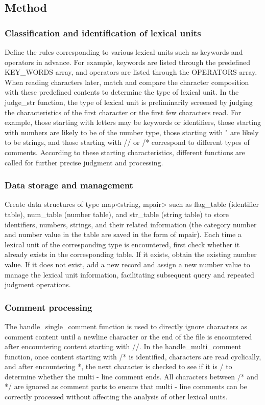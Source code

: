 \documentclass[a4paper,12pt]{article}
\begin{document}
\subsection{Method}
\subsubsection{Classification and identification of lexical units}
Define the rules corresponding to various lexical units such as keywords and operators in advance. For example, keywords are listed through the predefined KEY\_WORDS array, and operators are listed through the OPERATORS array. When reading characters later, match and compare the character composition with these predefined contents to determine the type of lexical unit. In the judge\_str function, the type of lexical unit is preliminarily screened by judging the characteristics of the first character or the first few characters read. For example, those starting with letters may be keywords or identifiers, those starting with numbers are likely to be of the number type, those starting with " are likely to be strings, and those starting with // or /* correspond to different types of comments. According to these starting characteristics, different functions are called for further precise judgment and processing.
\subsubsection{Data storage and management}
Create data structures of type map<string, mpair> such as flag\_table (identifier table), num\_table (number table), and str\_table (string table) to store identifiers, numbers, strings, and their related information (the category number and number value in the table are saved in the form of mpair). Each time a lexical unit of the corresponding type is encountered, first check whether it already exists in the corresponding table. If it exists, obtain the existing number value. If it does not exist, add a new record and assign a new number value to manage the lexical unit information, facilitating subsequent query and repeated judgment operations.
\subsubsection{Comment processing}
The handle\_single\_comment function is used to directly ignore characters as comment content until a newline character or the end of the file is encountered after encountering content starting with //. In the handle\_multi\_comment function, once content starting with /* is identified, characters are read cyclically, and after encountering *, the next character is checked to see if it is / to determine whether the multi - line comment ends. All characters between /* and */ are ignored as comment parts to ensure that multi - line comments can be correctly processed without affecting the analysis of other lexical units.
\end{document}
